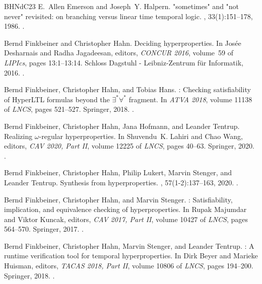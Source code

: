 \documentclass[dvipsnames,10pt,a4paper]{amsart}
\theoremstyle{definition}
\theoremstyle{remark}
\begin{document}
\begin{thebibliography}{BHNdC23}
E.~Allen Emerson and Joseph~Y. Halpern.
\newblock "sometimes" and "not never" revisited: on branching versus linear time temporal logic.
, 33(1):151--178, 1986.
\newblock \href {https://doi.org/10.1145/4904.4999} {}.

Bernd Finkbeiner and Christopher Hahn.
\newblock Deciding hyperproperties.
\newblock In Jos{\'{e}}e Desharnais and Radha Jagadeesan, editors, {\em {CONCUR} 2016}, volume~59 of {\em LIPIcs}, pages 13:1--13:14. Schloss Dagstuhl - Leibniz-Zentrum für Informatik, 2016.
\newblock \href {https://doi.org/10.4230/LIPIcs.CONCUR.2016.13} {}.

Bernd Finkbeiner, Christopher Hahn, and Tobias Hans.
: Checking satisfiability of {HyperLTL} formulas beyond the $\exists^* \forall^*$ fragment.
\newblock In {\em {ATVA} 2018}, volume 11138 of {\em LNCS}, pages 521--527. Springer, 2018.
\newblock \href {https://doi.org/10.1007/978-3-030-01090-4\_31} {}.

Bernd Finkbeiner, Christopher Hahn, Jana Hofmann, and Leander Tentrup.
\newblock Realizing $\omega$-regular hyperproperties.
\newblock In Shuvendu~K. Lahiri and Chao Wang, editors, {\em {CAV} 2020, Part {II}}, volume 12225 of {\em LNCS}, pages 40--63. Springer, 2020.
\newblock \href {https://doi.org/10.1007/978-3-030-53291-8\_4} {}.

Bernd Finkbeiner, Christopher Hahn, Philip Lukert, Marvin Stenger, and Leander Tentrup.
\newblock Synthesis from hyperproperties.
, 57(1-2):137--163, 2020.
\newblock \href {https://doi.org/10.1007/s00236-019-00358-2} {}.

Bernd Finkbeiner, Christopher Hahn, and Marvin Stenger.
: Satisfiability, implication, and equivalence checking of hyperproperties.
\newblock In Rupak Majumdar and Viktor Kuncak, editors, {\em {CAV} 2017, Part {II}}, volume 10427 of {\em LNCS}, pages 564--570. Springer, 2017.
\newblock \href {https://doi.org/10.1007/978-3-319-63390-9\_29} {}.

Bernd Finkbeiner, Christopher Hahn, Marvin Stenger, and Leander Tentrup.
: {A} runtime verification tool for temporal hyperproperties.
\newblock In Dirk Beyer and Marieke Huisman, editors, {\em {TACAS} 2018, Part {II}}, volume 10806 of {\em LNCS}, pages 194--200. Springer, 2018.
\newblock \href {https://doi.org/10.1007/978-3-319-89963-3\_11} {}.


\end{thebibliography}
\end{document}
